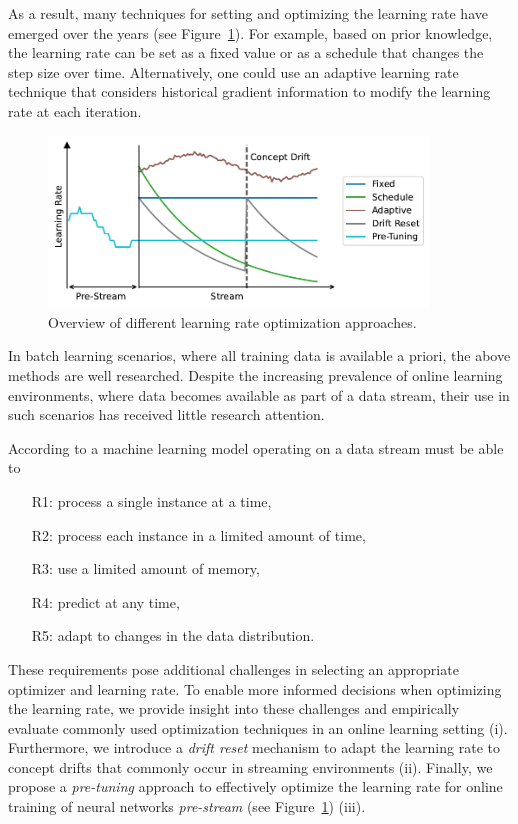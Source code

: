 \documentclass{article} %
\begin{document}
As a result, many techniques for setting and optimizing the learning rate have emerged over the years (see Figure~\ref{fig:lr_overview}).
For example, based on prior knowledge, the learning rate can be set as a fixed value or as a schedule that changes the step size over time.
Alternatively, one could use an adaptive learning rate technique that considers historical gradient information to modify the learning rate at each iteration.
\begin{figure}[ht]
   \centering
   \includegraphics[width=0.9\textwidth]{figures/lr_overview.pdf}
   \caption{Overview of different learning rate optimization approaches.}
   \label{fig:lr_overview}
\end{figure}
In batch learning scenarios, where all training data is available a priori, the above methods are well researched.
Despite the increasing prevalence of online learning environments, where data becomes available as part of a data stream, their use in such scenarios has received little research attention.

According to \citet{bifetMOAMassiveOnline2010} a machine learning model operating on a data stream must be able to
\begin{enumerate}
   \item[R1:] process a single instance at a time,\label{rq:single_instance}
   \item[R2:] process each instance in a limited amount of time,\label{rq:limited_time}
   \item[R3:] use a limited amount of memory,\label{rq:limited_memory}
   \item[R4:] predict at any time,\label{rq:predict_any_time}
   \item[R5:] adapt to changes in the data distribution.\label{rq:adapt_to_drift}
\end{enumerate}


These requirements pose additional challenges in selecting an appropriate optimizer and learning rate.
To enable more informed decisions when optimizing the learning rate, we provide insight into these challenges and empirically evaluate commonly used optimization techniques in an online learning setting (i).
Furthermore, we introduce a \textit{drift reset} mechanism to adapt the learning rate to concept drifts that commonly occur in streaming environments (ii).
Finally, we propose a \textit{pre-tuning} approach to effectively optimize the learning rate for online training of neural networks \textit{pre-stream} (see Figure~\ref{fig:lr_overview}) (iii). %
\end{document}

